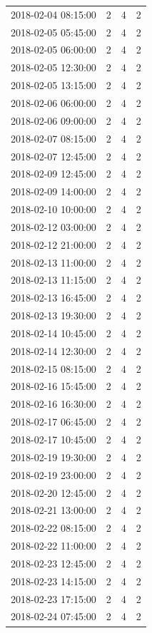 \begin{tabular}{lrrr}
2018-02-04 08:15:00 & 2 & 4 & 2 \\
2018-02-05 05:45:00 & 2 & 4 & 2 \\
2018-02-05 06:00:00 & 2 & 4 & 2 \\
2018-02-05 12:30:00 & 2 & 4 & 2 \\
2018-02-05 13:15:00 & 2 & 4 & 2 \\
2018-02-06 06:00:00 & 2 & 4 & 2 \\
2018-02-06 09:00:00 & 2 & 4 & 2 \\
2018-02-07 08:15:00 & 2 & 4 & 2 \\
2018-02-07 12:45:00 & 2 & 4 & 2 \\
2018-02-09 12:45:00 & 2 & 4 & 2 \\
2018-02-09 14:00:00 & 2 & 4 & 2 \\
2018-02-10 10:00:00 & 2 & 4 & 2 \\
2018-02-12 03:00:00 & 2 & 4 & 2 \\
2018-02-12 21:00:00 & 2 & 4 & 2 \\
2018-02-13 11:00:00 & 2 & 4 & 2 \\
2018-02-13 11:15:00 & 2 & 4 & 2 \\
2018-02-13 16:45:00 & 2 & 4 & 2 \\
2018-02-13 19:30:00 & 2 & 4 & 2 \\
2018-02-14 10:45:00 & 2 & 4 & 2 \\
2018-02-14 12:30:00 & 2 & 4 & 2 \\
2018-02-15 08:15:00 & 2 & 4 & 2 \\
2018-02-16 15:45:00 & 2 & 4 & 2 \\
2018-02-16 16:30:00 & 2 & 4 & 2 \\
2018-02-17 06:45:00 & 2 & 4 & 2 \\
2018-02-17 10:45:00 & 2 & 4 & 2 \\
2018-02-19 19:30:00 & 2 & 4 & 2 \\
2018-02-19 23:00:00 & 2 & 4 & 2 \\
2018-02-20 12:45:00 & 2 & 4 & 2 \\
2018-02-21 13:00:00 & 2 & 4 & 2 \\
2018-02-22 08:15:00 & 2 & 4 & 2 \\
2018-02-22 11:00:00 & 2 & 4 & 2 \\
2018-02-23 12:45:00 & 2 & 4 & 2 \\
2018-02-23 14:15:00 & 2 & 4 & 2 \\
2018-02-23 17:15:00 & 2 & 4 & 2 \\
2018-02-24 07:45:00 & 2 & 4 & 2 \\

\end{tabular}
